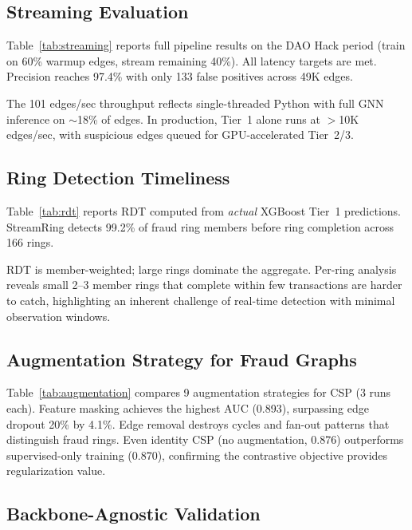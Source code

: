 \documentclass[sigconf, anonymous, review]{acmart}
\begin{document}
\subsection{Streaming Evaluation}

Table~\ref{tab:streaming} reports full pipeline results on the DAO Hack period (train on 60\% warmup edges, stream remaining 40\%). All latency targets are met. Precision reaches 97.4\% with only 133 false positives across 49K edges.



The 101 edges/sec throughput reflects single-threaded Python with full GNN inference on ${\sim}$18\% of edges. In production, Tier~1 alone runs at $>$10K edges/sec, with suspicious edges queued for GPU-accelerated Tier~2/3.

\subsection{Ring Detection Timeliness}

Table~\ref{tab:rdt} reports RDT computed from \emph{actual} XGBoost Tier~1 predictions. StreamRing detects 99.2\% of fraud ring members before ring completion across 166 rings.



RDT is member-weighted; large rings dominate the aggregate. Per-ring analysis reveals small 2--3 member rings that complete within few transactions are harder to catch, highlighting an inherent challenge of real-time detection with minimal observation windows.

\subsection{Augmentation Strategy for Fraud Graphs}
\label{sec:augmentation}

Table~\ref{tab:augmentation} compares 9 augmentation strategies for CSP (3 runs each). Feature masking achieves the highest AUC (0.893), surpassing edge dropout 20\% by 4.1\%. Edge removal destroys cycles and fan-out patterns that distinguish fraud rings. Even identity CSP (no augmentation, 0.876) outperforms supervised-only training (0.870), confirming the contrastive objective provides regularization value.



\subsection{Backbone-Agnostic Validation}
\end{document}
